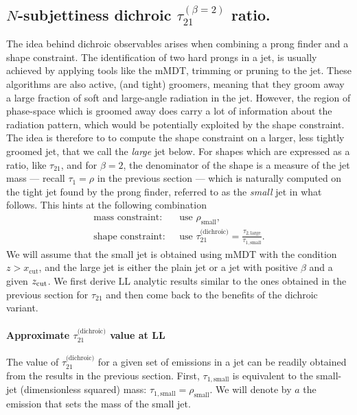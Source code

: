 \subsection{$N$-subjettiness dichroic $\tau_{21}^{(\beta=2)}$ ratio.}\label{sec:2prongs-analytic-dichroic}

The idea behind dichroic observables arises when combining a prong
finder and a shape constraint.
%
The identification of two hard prongs in a jet, is usually achieved by applying tools
like the mMDT, trimming or pruning to the jet. These algorithms are also active,
(and tight) groomers, meaning that they groom away a large fraction of soft and large-angle radiation in the jet. However, the region of phase-space which is groomed away does carry a lot of information about the radiation pattern, which would be potentially exploited by the shape constraint.
%
The idea is therefore to to compute the shape constraint on a larger,
less tightly groomed jet, that we call the {\em large} jet below. For
shapes which are expressed as a ratio, like $\tau_{21}$, and for
$\beta=2$, the denominator of the shape is a measure of the jet mass
--- recall $\tau_1=\rho$ in the previous section --- which is
naturally computed on the tight jet found by the prong finder,
referred to as the {\em small} jet in what follows.
%
This hints at the following combination
\begin{align}
  \text{mass constraint: }&\text{ use }\rho_{\text{small}},\\
  \text{shape constraint: }&\text{ use }\tau_{21}^{\text{(dichroic)}}=\frac{\tau_{2,\text{large}}}{\tau_{1,\text{small}}}.
\end{align}
We will assume that the small jet is obtained using mMDT with the
condition $z>x_\text{cut}$, and the large jet is either the plain jet
or a \SD jet with positive $\beta$ and a given $z_{\text{cut}}$.
%
We first derive LL analytic results similar to the ones obtained
in the previous section for $\tau_{21}$ and then come back to the
benefits of the dichroic variant.

\paragraph{Approximate $\tau_{21}^\text{(dichroic)}$ value at LL}
%
The value of $\tau_{21}^\text{(dichroic)}$ for a given set of
emissions in a jet can be readily obtained from the results in the
previous section. First, $\tau_{1,\text{small}}$ is
equivalent to the small-jet (dimensionless squared) mass:
$\tau_{1,\text{small}}=\rho_\text{small}$. We will denote by $a$ the
emission that sets the mass of the small jet.


